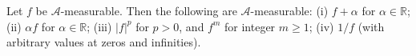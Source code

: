 Let $f$ be $\mathcal{A}$-measurable. Then the following are $\mathcal{A}$-measurable:
(i) $f + \alpha$ for $\alpha \in \mathbb{R}$;
(ii) $\alpha f$ for $\alpha \in \mathbb{R}$;
(iii) $|f|^p$ for $p > 0$, and $f^m$ for integer $m \geq 1$;
(iv) $1/f$ (with arbitrary values at zeros and infinities).